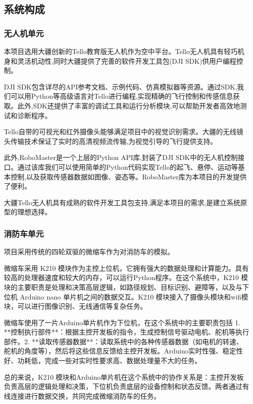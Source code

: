 \documentclass[12pt, a4paper, oneside]{article}
\begin{document}
\subsection{系统构成}

\subsubsection{无人机单元}

本项目选用大疆创新的Tello教育版无人机作为空中平台。Tello无人机具有轻巧机身和灵活机动性,同时大疆提供了完善的软件开发工具包(DJI SDK)供用户编程控制。

DJI SDK包含详尽的API参考文档、示例代码、仿真模拟器等资源。通过SDK,我们可以用Python等高级语言对Tello进行编程,实现精确的飞行控制和传感信息获取。此外,SDK还提供了丰富的调试工具和运行分析模块,可以帮助开发者高效地测试和诊断程序。

Tello自带的可视光和红外摄像头能够满足项目中的视觉识别需求。大疆的无线镜头传输技术保证了实时的高清视频流传输,为视觉引导的飞行提供支持。

此外,RoboMaster是一个上层的Python API库,封装了DJI SDK中的无人机控制接口。通过该库我们可以使用简单的Python代码实现Tello的起飞、悬停、运动等基本控制,以及获取传感器数据如图像、姿态等。RoboMaster库为本项目的开发提供了便利。

大疆Tello无人机具有成熟的软件开发工具包支持,满足本项目的需求,是建立系统原型的理想选择。

\subsubsection{消防车单元}

项目采用传统的四轮双驱的微缩车作为对消防车的模拟。

微缩车采用 K210 模块作为主控上位机，它拥有强大的数据处理和计算能力。具有较高的处理器速度和较大的内存，可以运行Python程序。在这个系统中，K210 模块的主要职责是处理和决策高层逻辑，如路径规划、目标识别、避障等，以及与下位机 Arduino nano 单片机之间的数据交互。K210 模块接入了摄像头模块和wifi模块，可以进行图像识别、无线通信等复杂任务。

微缩车使用了一片Arduino单片机作为下位机，在这个系统中的主要职责包括 1. **控制执行部件**：根据主控开发板的指令，生成控制信号驱动电机、舵机等执行部件。2. **读取传感器数据**：读取系统中的各种传感器数据（如电机的转速、舵机的角度等），然后将这些信息反馈给主控开发板。Arduino实时性强、稳定性好、功耗低，完成一些对实时性要求高、数据处理量不大的任务。

总的来说，K210 模块和Arduino单片机在这个系统中的协作关系是：主控开发板负责高层的逻辑处理和决策，下位机负责底层的设备控制和状态反馈。两者通过有线连接进行数据交换，共同完成微缩消防车的任务。
\end{document}
